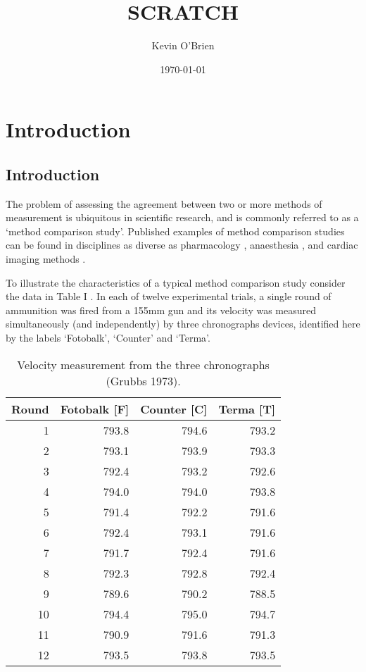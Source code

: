 \documentclass[12pt, a4paper]{report}
\begin{document}
	\author{Kevin O'Brien}
	\title{SCRATCH}
	\date{\today}
	\maketitle
	
	\tableofcontents \setcounter{tocdepth}{2}

\chapter{Introduction}

		\section{Introduction}
		The problem of assessing the agreement between two or more methods
		of measurement is ubiquitous in scientific research, and is
		commonly referred to as a `method comparison study'. Published
		examples of method comparison studies can be found in disciplines
		as diverse as pharmacology \citep{ludbrook97}, anaesthesia
		\citep{Myles}, and cardiac imaging methods \citep{Krumm}.
		\smallskip
		
		To illustrate the characteristics of a typical method comparison
		study consider the data in Table I \citep{Grubbs73}. In each of
		twelve experimental trials, a single round of ammunition was fired
		from a 155mm gun and its velocity was measured simultaneously (and
		independently) by three chronographs devices, identified here by
		the labels `Fotobalk', `Counter' and `Terma'.
		\smallskip
		

		
		\begin{table}[ht]
			\begin{center}
				\begin{tabular}{rrrr}
					\hline
					Round& Fotobalk [F] & Counter [C]& Terma [T]\\
					\hline
					1 & 793.8 & 794.6 & 793.2 \\
					2 & 793.1 & 793.9 & 793.3 \\
					3 & 792.4 & 793.2 & 792.6 \\
					4 & 794.0 & 794.0 & 793.8 \\
					5 & 791.4 & 792.2 & 791.6 \\
					6 & 792.4 & 793.1 & 791.6 \\
					7 & 791.7 & 792.4 & 791.6 \\
					8 & 792.3 & 792.8 & 792.4 \\
					9 & 789.6 & 790.2 & 788.5 \\
					10 & 794.4 & 795.0 & 794.7 \\
					11 & 790.9 & 791.6 & 791.3 \\
					12 & 793.5 & 793.8 & 793.5 \\
					\hline
				\end{tabular}
				\caption{Velocity measurement from the three chronographs (Grubbs
					1973).}
			\end{center}
		\end{table}
		
\end{document}
